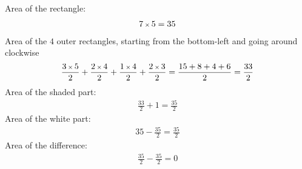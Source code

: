 Area of the rectangle: 
\begin{align*}
7 \operatorname{\mbox{\scriptsize$\times$}} 5 = 35
\end{align*}
Area of the $4$ outer rectangles, starting from the bottom-left and going around clockwise
\begin{align*}
\frac{3 \operatorname{\mbox{\scriptsize$\times$}} 5}{2} + \frac{2 \operatorname{\mbox{\scriptsize$\times$}} 4}{2} + \frac{1 \operatorname{\mbox{\scriptsize$\times$}} 4}{2} + \frac{2 \operatorname{\mbox{\scriptsize$\times$}} 3}{2}
= \frac{15+8+4+6}{2}
= \frac{33}{2}
\end{align*}
Area of the shaded part:
\begin{align*}
\frac{33}{2} + 1
= \frac{35}{2}
\end{align*}
Area of the white part:
\begin{align*}
35 - \frac{35}{2}
= \frac{35}{2}
\end{align*}
Area of the difference:
\begin{align*}
\frac{35}{2} - \frac{35}{2}
= 0
\end{align*}
